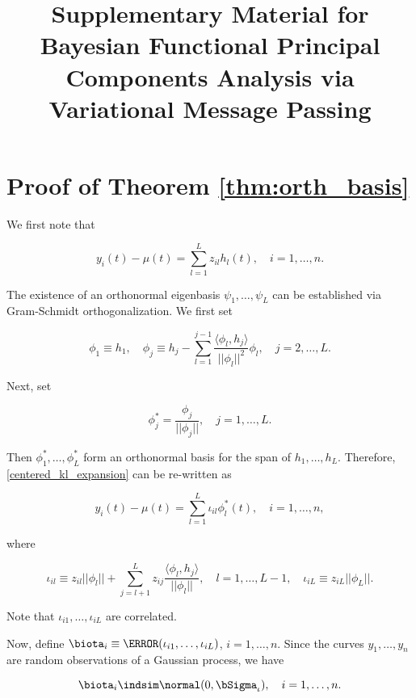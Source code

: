 \documentclass[12pt]{article}
\title{Supplementary Material for Bayesian Functional Principal Components Analysis via Variational Message Passing}
\date{}
\author{}
\theoremstyle{plain}
\theoremstyle{definition}
\theoremstyle{remark}
\begin{document}
\maketitle


\appendix
{}


\section{Proof of Theorem \ref{thm:orth_basis}}
\label{app:proof_thm_orth_basis}

We first note that

\begin{equation}
	y_i (t) - \mu (t) = \sum_{l=1}^L z_{il} h_l (t), \quad i = 1, \dots, n.
\label{centered_kl_expansion}
\end{equation}

\noindent The existence of an orthonormal eigenbasis $\psi_1, \dots, \psi_L$ can be established via Gram-Schmidt
orthogonalization. We first set

\[
	\phi_1 \equiv h_1, \quad
	\phi_j \equiv h_j - \sum_{l=1}^{j-1} \frac{\langle \phi_l, h_j \rangle}{|| \phi_l ||^2} \phi_l, \quad j = 2, \dots, L.
\]

\noindent Next, set

\[
	\phi^*_j = \frac{\phi_j}{|| \phi_j ||}, \quad j = 1, \dots, L.
\]

\noindent Then $\phi^*_1, \dots, \phi^*_L$ form an orthonormal basis for the span of $h_1, \dots, h_L$. Therefore,
\eqref{centered_kl_expansion} can be re-written as

\[
	y_i (t) - \mu (t) = \sum_{l=1}^L \iota_{il} \phi^*_l (t), \quad i = 1, \dots, n,
\]

\noindent where

\[
	\iota_{il} \equiv z_{il} ||\phi_l|| + \sum_{j=l+1}^L z_{ij} \frac{\langle \phi_l , h_j \rangle}{||\phi_l||}, \quad
	l = 1, \dots, L-1, \quad
	\iota_{iL} \equiv z_{iL} ||\phi_L||.
\]

\noindent Note that $\iota_{i1}, \dots, \iota_{iL}$ are correlated.

Now, define $\biota_i \equiv \T{(\iota_{i1}, \dots, \iota_{iL})}$, $i = 1, \dots, n$. Since the curves $y_1, \dots, y_n$ are
random observations of a Gaussian process, we have

\[
	\biota_i \indsim \normal (0, \bSigma_\iota), \quad i = 1, \dots, n.
\]
\end{document}
